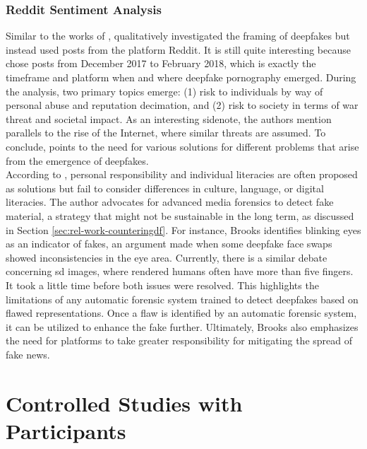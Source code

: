\documentclass[
  a4paper,  %
  twoside,  %
  bibliography=totoc,
  headsepline,
  cleardoublepage=empty,
  parskip=half,
  draft=false
]{scrbook}
\begin{document}
\subsubsection*{Reddit Sentiment Analysis}
Similar to the works of \citeauthor{leeBelieveNotBelieve2021}, \citeauthor{brooksPopularDiscourseDeepfakes2021} qualitatively investigated the framing of deepfakes but instead used posts from the platform Reddit. It is still quite interesting because \citeauthor{brooksPopularDiscourseDeepfakes2021} chose posts from December 2017 to February 2018, which is exactly the timeframe and platform when and where deepfake pornography emerged. During the analysis, two primary topics emerge: (1) risk to individuals by way of personal abuse and reputation decimation, and (2) risk to society in terms of war threat and societal impact. As an interesting sidenote, the authors mention parallels to the rise of the Internet, where similar threats are assumed. To conclude, \citeauthor{brooksPopularDiscourseDeepfakes2021} points to the need for various solutions for different problems that arise from the emergence of deepfakes. \\
According to \citeauthor{brooksPopularDiscourseDeepfakes2021}, personal responsibility and individual literacies are often proposed as solutions but fail to consider differences in culture, language, or digital literacies. The author advocates for advanced media forensics to detect fake material, a strategy that might not be sustainable in the long term, as discussed in Section \ref{sec:rel-work-counteringdf}. For instance, Brooks identifies blinking eyes as an indicator of fakes, an argument made when some deepfake face swaps showed inconsistencies in the eye area. Currently, there is a similar debate concerning \gls{sd} images, where rendered humans often have more than five fingers. It took a little time before both issues were resolved. This highlights the limitations of any automatic forensic system trained to detect deepfakes based on flawed representations. Once a flaw is identified by an automatic forensic system, it can be utilized to enhance the fake further. Ultimately, Brooks also emphasizes the need for platforms to take greater responsibility for mitigating the spread of fake news.

\section{Controlled Studies with Participants}
\label{sec:rel-studypart}
\end{document}

